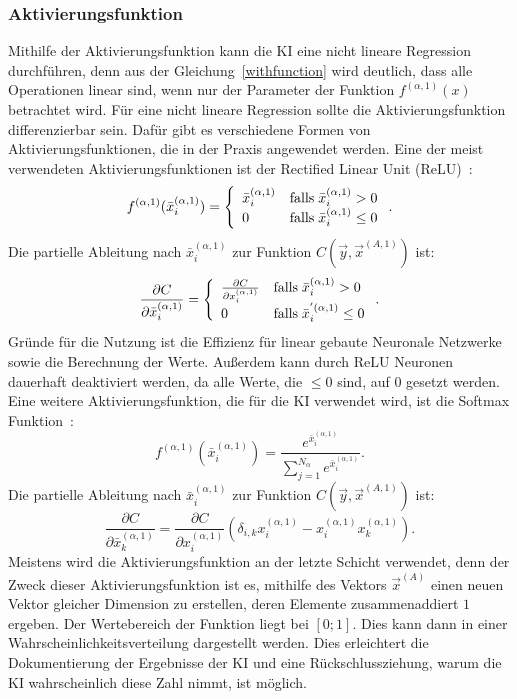 \documentclass[11pt]{article}
\begin{document}
\subsubsection{Aktivierungsfunktion}\label{activation}
Mithilfe der Aktivierungsfunktion kann die KI eine nicht lineare Regression durchführen, denn aus der Gleichung~\ref{withfunction} wird deutlich,
dass alle Operationen linear sind, wenn nur der Parameter der Funktion $f^{(\alpha,1)}(x)$ betrachtet wird. Für eine nicht lineare Regression sollte die
Aktivierungsfunktion differenzierbar sein. Dafür gibt es verschiedene Formen von Aktivierungsfunktionen, die in der Praxis angewendet werden.
Eine der meist verwendeten Aktivierungsfunktionen ist der Rectified Linear Unit (ReLU)~\cite{14}:
\begin{equation}
    f^{(\alpha,1)}(\bar{x}_{i}^{(\alpha,1)}) = \left\{
	\begin{array}{ll}
		\bar{x}_i^{(\alpha,1)}  & \mathrm{falls} \mkern5mu \bar{x}_i^{(\alpha,1)} > 0 \\
		0 & \mathrm{falls} \mkern5mu \bar{x}_i^{(\alpha,1)} \leq 0
	\end{array}
    \right..
\end{equation}
Die partielle Ableitung nach $\bar{x}_i^{(\alpha,1)}$ zur Funktion $C(\vec{y},\vec{x}^{(A,1)})$ ist:
\begin{equation}
    \frac{\partial C}{\partial \bar{x}_i^{(\alpha,1)}} = \left\{
	\begin{array}{ll}
		\frac{\partial C}{\partial {x}_i^{(\alpha,1)}}  & \mathrm{falls} \mkern5mu \bar{x}_i^{(\alpha,1)} > 0 \\
		0 & \mathrm{falls} \mkern5mu \bar{x}_i^{'(\alpha,1)} \leq 0
	\end{array}
    \right..
\end{equation}
Gründe für die Nutzung ist die Effizienz für linear gebaute Neuronale Netzwerke sowie die Berechnung der Werte. Außerdem kann durch ReLU
Neuronen dauerhaft deaktiviert werden, da alle Werte, die $\leq 0$ sind, auf $0$ gesetzt werden.
Eine weitere Aktivierungsfunktion, die für die KI verwendet wird, ist die Softmax Funktion~\cite{14}:
\begin{equation}\label{softmax}
    f^{(\alpha,1)}(\bar{x}_{i}^{(\alpha,1)}) = \frac{e^{\bar{x}_i^{(\alpha,1)}}}{\sum_{j=1}^{N_{\alpha}} e^{\bar{x}_i^{(\alpha,1)}}}.
\end{equation}
Die partielle Ableitung nach $\bar{x}_i^{(\alpha,1)}$ zur Funktion $C(\vec{y},\vec{x}^{(A,1)})$ ist:
\begin{equation}
    \frac{\partial C}{\partial \bar{x}_k^{(\alpha,1)}} = \frac{\partial C}{\partial {x}_i^{(\alpha,1)}} (\delta_{i,k}x_{i}^{(\alpha,1)}-x_{i}^{(\alpha,1)}x_{k}^{(\alpha,1)}).
\end{equation}
Meistens wird die Aktivierungsfunktion an der letzte Schicht verwendet, denn der Zweck dieser Aktivierungsfunktion ist es, mithilfe des Vektors
$ \vec{x}^{(A)} $ einen neuen Vektor gleicher Dimension zu erstellen, deren Elemente zusammenaddiert $1$ ergeben. Der Wertebereich der Funktion
liegt bei $[0;1]$. Dies kann dann in einer Wahrscheinlichkeitsverteilung dargestellt werden. Dies erleichtert die Dokumentierung der Ergebnisse der KI
und eine Rückschlussziehung, warum die KI wahrscheinlich diese Zahl nimmt, ist möglich.
\end{document}
